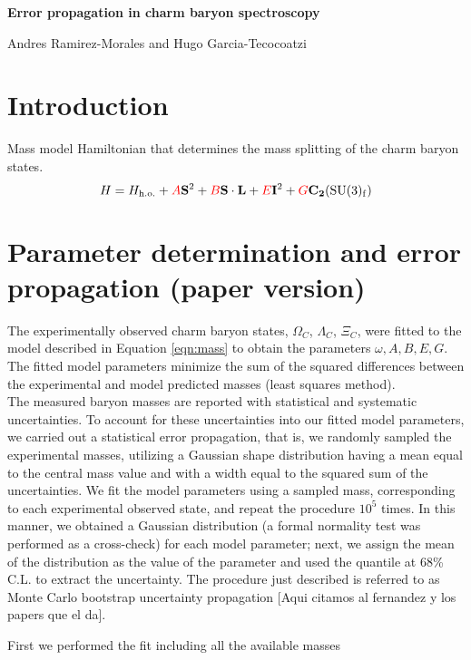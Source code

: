 \documentclass{article}
\begin{document}
\centerline{\LARGE{\textbf{Error propagation in charm baryon spectroscopy}}}
\smallskip
\centerline{Andres Ramirez-Morales and Hugo Garcia-Tecocoatzi}

\section*{Introduction}

Mass model Hamiltonian that determines the mass splitting of the charm baryon states.
\begin{equation}
\label{eqn:mass}
H = H_{\mathrm{h.o.}} + \textcolor{red}{A}\mathbf{S}^{2} + \textcolor{red}{B}\mathbf{S\cdot L} +  \textcolor{red}{E}\mathbf{I}^{2} + \textcolor{red}{G}\mathbf{C_{2}}(\mathrm{SU(3)_{f}})
\end{equation}

\section*{Parameter determination and error propagation (paper version)}

The experimentally observed charm baryon states, $\Omega_{C}$, $\Lambda_{C}$, $\Xi_{C}$, were fitted to the model described in Equation \ref{eqn:mass} to obtain the parameters $\omega, A, B, E, G$. The fitted model parameters minimize the sum of the squared differences between the experimental and model predicted masses (least squares method).\\

The measured baryon masses are reported with statistical and systematic uncertainties. To account for these uncertainties into our fitted model parameters, we carried out a statistical error propagation, that is, we randomly sampled the experimental masses, utilizing a Gaussian shape distribution having a mean equal to the central mass value and with a width equal to the squared sum of the uncertainties. We fit the model parameters using a sampled mass, corresponding to each experimental observed state, and repeat the procedure $10^5$ times. In this manner, we obtained a Gaussian distribution (a formal normality test was performed as a cross-check) for each model parameter; next, we assign the mean of the distribution as the value of the parameter and used the quantile at 68\% C.L. to extract the uncertainty. The procedure just described is referred to as Monte Carlo bootstrap uncertainty propagation [Aqui citamos al fernandez y los papers que el da].

First we performed the fit including all the available masses
\end{document}
